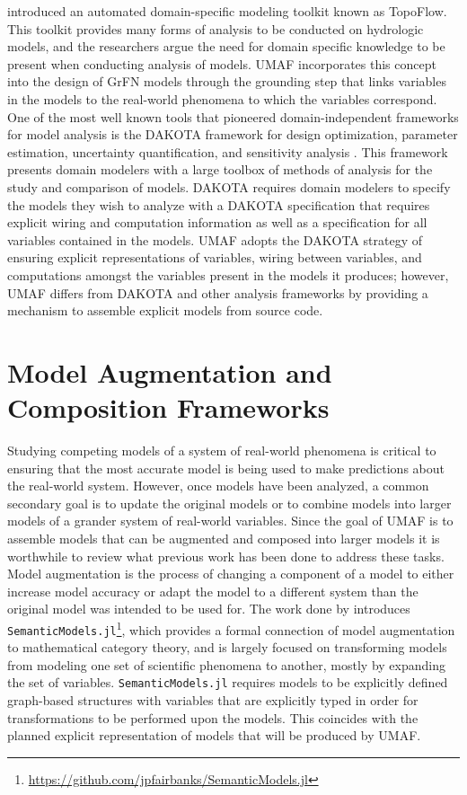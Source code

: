 \citet{peckham2017reproducible} introduced an automated domain-specific modeling toolkit known as TopoFlow.
This toolkit provides many forms of analysis to be conducted on hydrologic models, and the researchers argue the need for domain specific knowledge to be present when conducting analysis of models.
UMAF incorporates this concept into the design of GrFN models through the grounding step that links variables in the models to the real-world phenomena to which the variables correspond.
One of the most well known tools that pioneered domain-independent frameworks for model analysis is the DAKOTA framework for design optimization, parameter estimation, uncertainty quantification, and sensitivity analysis \citep{adams2009dakota}.
This framework presents domain modelers with a large toolbox of methods of analysis for the study and comparison of models.
DAKOTA requires domain modelers to specify the models they wish to analyze with a DAKOTA specification that requires explicit wiring and computation information as well as a specification for all variables contained in the models.
UMAF adopts the DAKOTA strategy of ensuring explicit representations of variables, wiring between variables, and computations amongst the variables present in the models it produces; however, UMAF differs from DAKOTA and other analysis frameworks by providing a mechanism to assemble explicit models from source code.

\section{Model Augmentation and Composition Frameworks \label{sec:rwork_composition}}
Studying competing models of a system of real-world phenomena is critical to ensuring that the most accurate model is being used to make predictions about the real-world system.
However, once models have been analyzed, a common secondary goal is to update the original models or to combine models into larger models of a grander system of real-world variables.
Since the goal of UMAF is to assemble models that can be augmented and composed into larger models it is worthwhile to review what previous work has been done to address these tasks.
Model augmentation is the process of changing a component of a model to either increase model accuracy or adapt the model to a different system than the original model was intended to be used for.
The work done by \citet{semanticModels2019} introduces \texttt{SemanticModels.jl}\footnote{\url{https://github.com/jpfairbanks/SemanticModels.jl}}, which provides a formal connection of model augmentation to mathematical category theory, and is largely focused on transforming models from modeling one set of scientific phenomena to another, mostly by expanding the set of variables.
\texttt{SemanticModels.jl} requires models to be explicitly defined graph-based structures with variables that are explicitly typed in order for transformations to be performed upon the models.
This coincides with the planned explicit representation of models that will be produced by UMAF.


